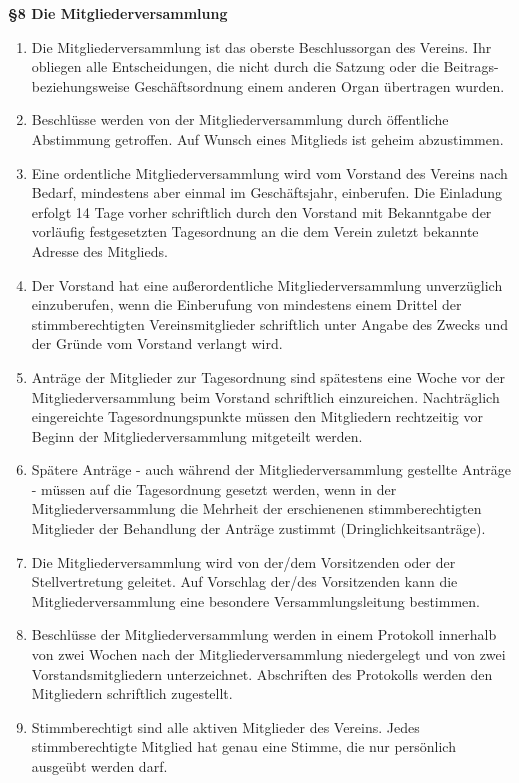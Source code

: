 \documentclass[a4paper,
               12pt,
               titlepage,
               parskip=half]{scrartcl}
\begin{document}
\textbf{§8 Die Mitgliederversammlung}
{\small
	\begin{enumerate}
		\item Die Mitgliederversammlung ist das oberste Beschlussorgan des Vereins. Ihr obliegen alle Entscheidungen, die nicht durch die Satzung oder die Beitrags- beziehungsweise Geschäftsordnung einem anderen Organ übertragen wurden.
		\item Beschlüsse werden von der Mitgliederversammlung durch öffentliche Abstimmung getroffen. Auf Wunsch eines Mitglieds ist geheim abzustimmen.
		\item Eine ordentliche Mitgliederversammlung wird vom Vorstand des Vereins nach Bedarf, mindestens aber einmal im Geschäftsjahr, einberufen. Die Einladung erfolgt 14 Tage vorher schriftlich durch den Vorstand mit Bekanntgabe der vorläufig festgesetzten Tagesordnung an die dem Verein zuletzt bekannte Adresse des Mitglieds.
		\item Der Vorstand hat eine außerordentliche Mitgliederversammlung unverzüglich einzuberufen,
		wenn die Einberufung von mindestens einem Drittel der stimmberechtigten Vereinsmitglieder schriftlich unter Angabe des Zwecks und der Gründe vom Vorstand verlangt wird.
		\item Anträge der Mitglieder zur Tagesordnung sind spätestens eine Woche vor der Mitgliederversammlung beim Vorstand schriftlich einzureichen. Nachträglich eingereichte Tagesordnungspunkte müssen den Mitgliedern rechtzeitig vor Beginn der Mitgliederversammlung mitgeteilt werden.
		\item Spätere Anträge - auch während der Mitgliederversammlung gestellte Anträge - müssen auf die Tagesordnung gesetzt werden, wenn in der Mitgliederversammlung die Mehrheit der erschienenen stimmberechtigten Mitglieder der Behandlung der Anträge zustimmt (Dringlichkeitsanträge).
		\item Die Mitgliederversammlung wird von der/dem Vorsitzenden oder der Stellvertretung geleitet. Auf Vorschlag der/des Vorsitzenden kann die Mitgliederversammlung eine besondere Versammlungsleitung bestimmen.
		\item Beschlüsse der Mitgliederversammlung werden in einem Protokoll innerhalb von zwei Wochen nach der Mitgliederversammlung niedergelegt und von zwei Vorstandsmitgliedern unterzeichnet. Abschriften des Protokolls werden den Mitgliedern schriftlich zugestellt.
		\item Stimmberechtigt sind alle aktiven Mitglieder des Vereins. Jedes stimmberechtigte Mitglied hat genau eine Stimme, die nur persönlich ausgeübt werden darf.

\end{enumerate}}
\end{document}

